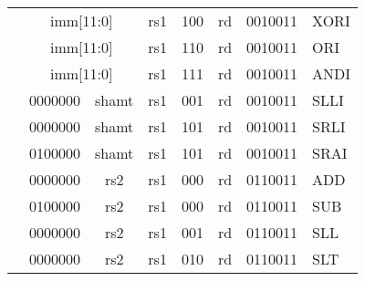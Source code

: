 \begin{table}[p]
\begin{small}
\begin{center}
\begin{tabular}{p{0in}p{0.4in}p{0.05in}p{0.05in}p{0.05in}p{0.05in}p{0.4in}p{0.6in}p{0.4in}p{0.6in}p{0.7in}l}
&
\multicolumn{6}{|c|}{imm[11:0]} &
\multicolumn{1}{c|}{rs1} &
\multicolumn{1}{c|}{100} &
\multicolumn{1}{c|}{rd} &
\multicolumn{1}{c|}{0010011} & XORI \\
\cline{2-11}
  

&
\multicolumn{6}{|c|}{imm[11:0]} &
\multicolumn{1}{c|}{rs1} &
\multicolumn{1}{c|}{110} &
\multicolumn{1}{c|}{rd} &
\multicolumn{1}{c|}{0010011} & ORI \\
\cline{2-11}
  

&
\multicolumn{6}{|c|}{imm[11:0]} &
\multicolumn{1}{c|}{rs1} &
\multicolumn{1}{c|}{111} &
\multicolumn{1}{c|}{rd} &
\multicolumn{1}{c|}{0010011} & ANDI \\
\cline{2-11}
  

&
\multicolumn{4}{|c|}{0000000} &
\multicolumn{2}{c|}{shamt} &
\multicolumn{1}{c|}{rs1} &
\multicolumn{1}{c|}{001} &
\multicolumn{1}{c|}{rd} &
\multicolumn{1}{c|}{0010011} & SLLI \\
\cline{2-11}
  

&
\multicolumn{4}{|c|}{0000000} &
\multicolumn{2}{c|}{shamt} &
\multicolumn{1}{c|}{rs1} &
\multicolumn{1}{c|}{101} &
\multicolumn{1}{c|}{rd} &
\multicolumn{1}{c|}{0010011} & SRLI \\
\cline{2-11}
  

&
\multicolumn{4}{|c|}{0100000} &
\multicolumn{2}{c|}{shamt} &
\multicolumn{1}{c|}{rs1} &
\multicolumn{1}{c|}{101} &
\multicolumn{1}{c|}{rd} &
\multicolumn{1}{c|}{0010011} & SRAI \\
\cline{2-11}
  

&
\multicolumn{4}{|c|}{0000000} &
\multicolumn{2}{c|}{rs2} &
\multicolumn{1}{c|}{rs1} &
\multicolumn{1}{c|}{000} &
\multicolumn{1}{c|}{rd} &
\multicolumn{1}{c|}{0110011} & ADD \\
\cline{2-11}
  

&
\multicolumn{4}{|c|}{0100000} &
\multicolumn{2}{c|}{rs2} &
\multicolumn{1}{c|}{rs1} &
\multicolumn{1}{c|}{000} &
\multicolumn{1}{c|}{rd} &
\multicolumn{1}{c|}{0110011} & SUB \\
\cline{2-11}
  

&
\multicolumn{4}{|c|}{0000000} &
\multicolumn{2}{c|}{rs2} &
\multicolumn{1}{c|}{rs1} &
\multicolumn{1}{c|}{001} &
\multicolumn{1}{c|}{rd} &
\multicolumn{1}{c|}{0110011} & SLL \\
\cline{2-11}
  

&
\multicolumn{4}{|c|}{0000000} &
\multicolumn{2}{c|}{rs2} &
\multicolumn{1}{c|}{rs1} &
\multicolumn{1}{c|}{010} &
\multicolumn{1}{c|}{rd} &
\multicolumn{1}{c|}{0110011} & SLT \\
\cline{2-11}
  


\end{tabular}
\end{center}
\end{small}
\end{table}
